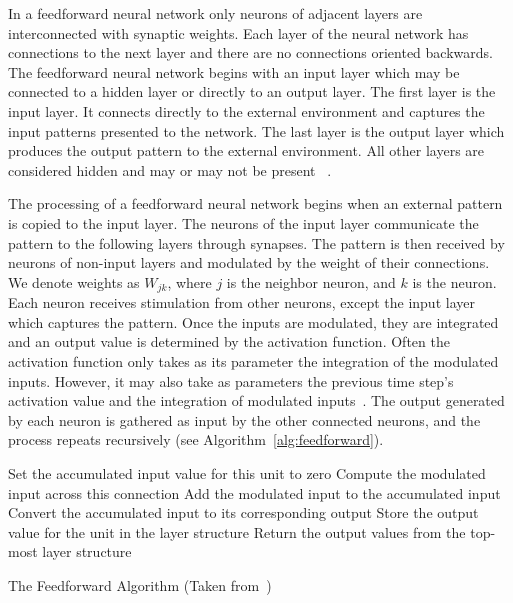\documentclass[11pt]{article}
\begin{document}
In a feedforward neural network only neurons of adjacent layers are interconnected with synaptic weights. Each layer of the neural
network has connections to the next layer and there are no connections oriented backwards. The feedforward neural network begins with an
input layer which may be connected to a hidden layer or directly to an output layer. The first layer is the input layer. It connects
directly to the external environment and captures the input patterns presented to the network. The last layer is the output layer which
produces the output pattern to the external environment. All other layers are considered hidden and may or may not be present~\cite{skapura} .

The processing of a feedforward neural network begins when an external pattern is copied to the input layer. The neurons of the input
layer communicate the pattern to the following layers through synapses. The pattern is then received by neurons of non-input layers and
modulated by the weight of their connections. We denote weights as $W_{jk}$, where $j$ is the neighbor neuron, and $k$ is the neuron.
Each neuron receives stimulation from other neurons, except the input layer which captures the pattern. Once the inputs are modulated,
they are integrated and an output value is determined by the activation function. Often the activation function only takes as its
parameter the integration of the modulated inputs. However, it may also take as parameters the previous time step's activation value and
the integration of modulated inputs~\cite{skapura}. The output generated by each neuron is gathered as input by the other connected neurons, and the
process repeats recursively (see Algorithm~\ref{alg:feedforward}).

\begin{algorithm}%
\dontprintsemicolon
{}
\SetLine
{}
{
	{
		Set the accumulated input value for this unit to zero\;
			{
				Compute the modulated input across this connection\;
				Add the modulated input to the accumulated input\;
			}
		Convert the accumulated input to its corresponding output\;
		Store the output value for the unit in the layer structure\;
	}
	Return the output values from the top-most layer structure\;
}

\caption{The Feedforward Algorithm (Taken from~\cite{skapura})}
\label{alg:feedforward}
\end{algorithm}
\end{document}
